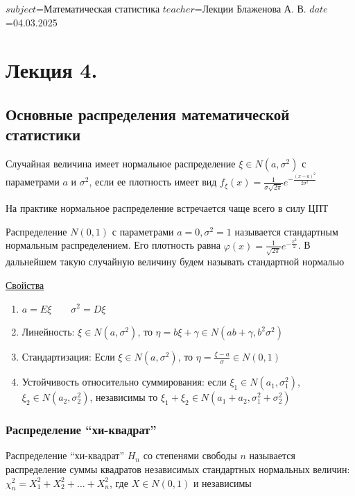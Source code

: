 $subject$=Математическая статистика
$teacher$=Лекции Блаженова А. В.
$date$=04.03.2025

\section{Лекция 4.}

\subsection{Основные распределения математической статистики}

\Def Случайная величина имеет нормальное распределение $\xi \in N(a, \sigma^2)$ с параметрами $a$ и $\sigma^2$, если
ее плотность имеет вид $f_\xi(x) = \frac{1}{\sigma\sqrt{2\pi}} e^{-\frac{(x - a)^2}{2\sigma^2}}$

На практике нормальное распределение встречается чаще всего в силу ЦПТ

\Def Распределение $N(0, 1)$ с параметрами $a = 0, \sigma^2 = 1$ называется стандартным нормальным распределением. 
Его плотность равна $\varphi(x) = \frac{1}{\sqrt{2\pi}} e^{-\frac{x^2}{2}}$. 
В дальнейшем такую случайную величину будем называть стандартной нормалью

\underline{Свойства}

\begin{enumerate}
    \item $a = E\xi \qquad \sigma^2 = D\xi$

    \item Линейность: $\xi \in N(a, \sigma^2)$, то $\eta = b \xi + \gamma \in N(ab + \gamma, b^2 \sigma^2)$

    \item Стандартизация: Если $\xi \in N(a, \sigma^2)$, то $\eta = \frac{\xi - a}{\sigma} \in N(0, 1)$

    \item Устойчивость относительно суммирования: если $\xi_1 \in N(a_1, \sigma^2_1)$, $\xi_2 \in N(a_2, \sigma^2_2)$, независимы
    то $\xi_1 + \xi_2 \in N(a_1 + a_2, \sigma^2_1 + \sigma^2_2)$
\end{enumerate}

\subsubsection{Распределение \enquote{хи-квадрат}}

\Def Распределение \enquote{хи-квадрат} $H_n$ со степенями свободы $n$ называется распределение
суммы квадратов независимых стандартных нормальных величин: $\chi^2_n = X_1^2 + X_2^2 + \dots + X_n^2$, 
где $X \in N(0, 1)$ и независимы

